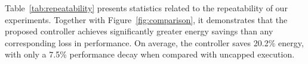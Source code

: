 



Table~\ref{tab:repeatability} presents statistics related to the repeatability of our experiments. Together with Figure~\ref{fig:comparison}, it demonstrates that the proposed controller achieves significantly greater energy savings than any corresponding loss in performance. On average, the controller saves 20.2\% energy, with only a 7.5\%  performance decay when compared with uncapped execution.


